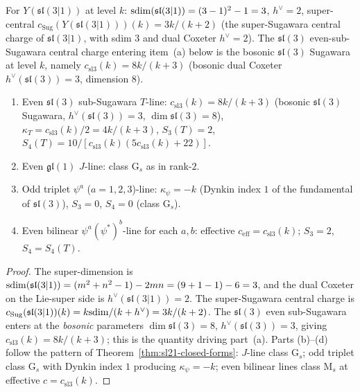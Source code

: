 \begin{theorem}
\label{thm:sl31-closed-forms}
For $Y(\mathfrak{sl}(3|1))$ at level $k$:
$\mathrm{sdim}(\mathfrak{sl}(3|1)) = (3-1)^2 - 1 = 3$, $h^\vee = 2$, super-central
$c_{\mathrm{Sug}}(Y(\mathfrak{sl}(3|1)))(k) = 3 k / (k + 2)$ (the
super-Sugawara central charge of $\mathfrak{sl}(3|1)$, with sdim 3
and dual Coxeter $h^\vee = 2$). The $\mathfrak{sl}(3)$ even-sub-Sugawara
central charge entering item~(a) below is the bosonic $\mathfrak{sl}(3)$
Sugawara at level $k$, namely $c_{\mathrm{sl3}}(k) = 8 k / (k + 3)$
(bosonic dual Coxeter $h^\vee(\mathfrak{sl}(3)) = 3$, dimension $8$).
\begin{enumerate}[label=\textup{(\alph*)},nosep]
\item Even $\mathfrak{sl}(3)$ sub-Sugawara $T$-line:
 $c_{\mathrm{sl3}}(k) = 8 k / (k + 3)$ (bosonic $\mathfrak{sl}(3)$
 Sugawara, $h^\vee(\mathfrak{sl}(3)) = 3$, $\dim \mathfrak{sl}(3) = 8$),
 $\kappa_T = c_{\mathrm{sl3}}(k)/2 = 4 k / (k + 3)$, $S_3(T) = 2$,
 $S_4(T) = 10 / [c_{\mathrm{sl3}}(k)(5 c_{\mathrm{sl3}}(k) + 22)]$.
\item Even $\mathfrak{gl}(1)$ $J$-line: class G$_s$ as in rank-$2$.
\item Odd triplet $\psi^{a}$ ($a = 1, 2, 3$)-line:
 $\kappa_\psi = -k$ (Dynkin index $1$ of the fundamental of
 $\mathfrak{sl}(3)$), $S_3 = 0$, $S_4 = 0$ (class G$_s$).
\item Even bilinear $\psi^a (\psi^*)^b$-line for each $a, b$: effective
 $c_{\mathrm{eff}} = c_{\mathrm{sl3}}(k)$; $S_3 = 2$, $S_4 = S_4(T)$.
\end{enumerate}
\end{theorem}

\begin{proof}[Proof]
The super-dimension is
$\mathrm{sdim}(\mathfrak{sl}(3|1)) = (m^2 + n^2 - 1) - 2 m n
= (9 + 1 - 1) - 6 = 3$, and the dual Coxeter on the Lie-super side is
$h^\vee(\mathfrak{sl}(3|1)) = 2$. The super-Sugawara central charge
is $c_{\mathrm{Sug}}(\mathfrak{sl}(3|1))(k) = k \mathrm{sdim} / (k + h^\vee)
= 3 k / (k + 2)$. The $\mathfrak{sl}(3)$ even sub-Sugawara enters at
the \emph{bosonic} parameters $\dim \mathfrak{sl}(3) = 8$,
$h^\vee(\mathfrak{sl}(3)) = 3$, giving
$c_{\mathrm{sl3}}(k) = 8 k / (k + 3)$; this is the quantity driving
part~(a). Parts (b)--(d) follow the pattern of
Theorem~\ref{thm:sl21-closed-forms}: $J$-line class G$_s$; odd
triplet class G$_s$ with Dynkin index $1$ producing
$\kappa_\psi = -k$; even bilinear lines class M$_s$ at effective
$c = c_{\mathrm{sl3}}(k)$.
\end{proof}

